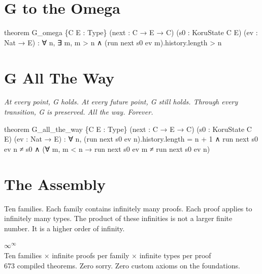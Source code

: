 \axiombadge

\section{G to the Omega}

\begin{leancode}
theorem G_omega \{C E : Type\}
     (next : C → E → C) (s0 : KoruState C E)
     (ev : Nat → E) :
     ∀ n, ∃ m, m > n ∧
         (run next s0 ev m).history.length > n
\end{leancode}

\axiombadge

\section{G All The Way}

\begin{theorembox}
\itshape At every point, G holds. At every future point, G still holds. Through every transition, G is preserved. All the way. Forever.
\end{theorembox}

\begin{leancode}
theorem G_all_the_way \{C E : Type\}
     (next : C → E → C) (s0 : KoruState C E)
     (ev : Nat → E) :
     ∀ n,
         (run next s0 ev n).history.length = n + 1 ∧
         run next s0 ev n ≠ s0 ∧
         (∀ m, m < n → run next s0 ev m ≠ run next s0 ev n)
\end{leancode}

\axiombadge

\section{The Assembly}

Ten families. Each family contains infinitely many proofs. Each proof applies to infinitely many types. The product of these infinities is not a larger finite number. It is a higher order of infinity.

\begin{center}
{\Huge\bfseries\color{korugreen} $\infty^{\infty}$}\\[0.5em]
{\small Ten families $\times$ infinite proofs per family $\times$ infinite types per proof}\\[0.3em]
{\small 673 compiled theorems. Zero sorry. Zero custom axioms on the foundations.}
\end{center}

